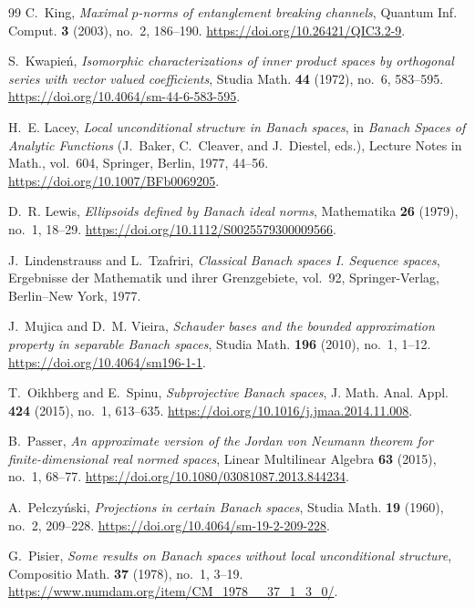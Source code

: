 \documentclass[11pt,a4paper,reqno]{amsart}
\theoremstyle{definition}
\numberwithin{equation}{section}
\begin{document}
\begin{thebibliography}{99}
C.~King, \emph{Maximal $p$-norms of entanglement breaking channels}, Quantum Inf. Comput. \textbf{3} (2003), no.~2, 186--190. \url{https://doi.org/10.26421/QIC3.2-9}.

S.~Kwapie\'n, \emph{Isomorphic characterizations of inner product spaces by orthogonal series with vector valued coefficients}, Studia Math. \textbf{44} (1972), no.~6, 583--595. \url{https://doi.org/10.4064/sm-44-6-583-595}.

H.~E. Lacey, \emph{Local unconditional structure in Banach spaces}, in \emph{Banach Spaces of Analytic Functions} (J.~Baker, C.~Cleaver, and J.~Diestel, eds.), Lecture Notes in Math., vol.~604, Springer, Berlin, 1977, 44--56. \url{https://doi.org/10.1007/BFb0069205}.

D.~R. Lewis, \emph{Ellipsoids defined by Banach ideal norms}, Mathematika \textbf{26} (1979), no.~1, 18--29. \url{https://doi.org/10.1112/S0025579300009566}.

J.~Lindenstrauss and L.~Tzafriri, \emph{Classical Banach spaces I. Sequence spaces}, Ergebnisse der Mathematik und ihrer Grenzgebiete, vol.~92, Springer-Verlag, Berlin--New York, 1977.

J.~Mujica and D.~M. Vieira, \emph{Schauder bases and the bounded approximation property in separable Banach spaces}, Studia Math. \textbf{196} (2010), no.~1, 1--12. \url{https://doi.org/10.4064/sm196-1-1}.

T.~Oikhberg and E.~Spinu, \emph{Subprojective Banach spaces}, J. Math. Anal. Appl. \textbf{424} (2015), no.~1, 613--635. \url{https://doi.org/10.1016/j.jmaa.2014.11.008}.

B.~Passer, \emph{An approximate version of the Jordan von Neumann theorem for finite-dimensional real normed spaces}, Linear Multilinear Algebra \textbf{63} (2015), no.~1, 68--77. \url{https://doi.org/10.1080/03081087.2013.844234}.

A.~Pe\l czy\'nski, \emph{Projections in certain Banach spaces}, Studia Math. \textbf{19} (1960), no.~2, 209--228. \url{https://doi.org/10.4064/sm-19-2-209-228}.

G.~Pisier, \emph{Some results on Banach spaces without local unconditional structure}, Compositio Math. \textbf{37} (1978), no.~1, 3--19. \url{https://www.numdam.org/item/CM_1978__37_1_3_0/}.


\end{thebibliography}
\end{document}
